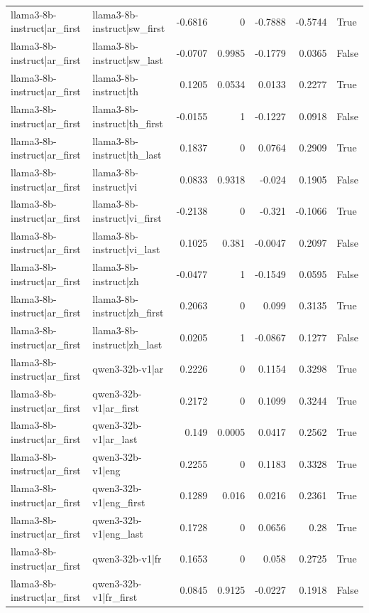 \begin{table}
\begin{tabular}{l l r r r r l}
llama3-8b-instruct|ar_first & llama3-8b-instruct|sw_first & -0.6816 & 0 & -0.7888 & -0.5744 & True \\
llama3-8b-instruct|ar_first & llama3-8b-instruct|sw_last & -0.0707 & 0.9985 & -0.1779 & 0.0365 & False \\
llama3-8b-instruct|ar_first & llama3-8b-instruct|th & 0.1205 & 0.0534 & 0.0133 & 0.2277 & True \\
llama3-8b-instruct|ar_first & llama3-8b-instruct|th_first & -0.0155 & 1 & -0.1227 & 0.0918 & False \\
llama3-8b-instruct|ar_first & llama3-8b-instruct|th_last & 0.1837 & 0 & 0.0764 & 0.2909 & True \\
llama3-8b-instruct|ar_first & llama3-8b-instruct|vi & 0.0833 & 0.9318 & -0.024 & 0.1905 & False \\
llama3-8b-instruct|ar_first & llama3-8b-instruct|vi_first & -0.2138 & 0 & -0.321 & -0.1066 & True \\
llama3-8b-instruct|ar_first & llama3-8b-instruct|vi_last & 0.1025 & 0.381 & -0.0047 & 0.2097 & False \\
llama3-8b-instruct|ar_first & llama3-8b-instruct|zh & -0.0477 & 1 & -0.1549 & 0.0595 & False \\
llama3-8b-instruct|ar_first & llama3-8b-instruct|zh_first & 0.2063 & 0 & 0.099 & 0.3135 & True \\
llama3-8b-instruct|ar_first & llama3-8b-instruct|zh_last & 0.0205 & 1 & -0.0867 & 0.1277 & False \\
llama3-8b-instruct|ar_first & qwen3-32b-v1|ar & 0.2226 & 0 & 0.1154 & 0.3298 & True \\
llama3-8b-instruct|ar_first & qwen3-32b-v1|ar_first & 0.2172 & 0 & 0.1099 & 0.3244 & True \\
llama3-8b-instruct|ar_first & qwen3-32b-v1|ar_last & 0.149 & 0.0005 & 0.0417 & 0.2562 & True \\
llama3-8b-instruct|ar_first & qwen3-32b-v1|eng & 0.2255 & 0 & 0.1183 & 0.3328 & True \\
llama3-8b-instruct|ar_first & qwen3-32b-v1|eng_first & 0.1289 & 0.016 & 0.0216 & 0.2361 & True \\
llama3-8b-instruct|ar_first & qwen3-32b-v1|eng_last & 0.1728 & 0 & 0.0656 & 0.28 & True \\
llama3-8b-instruct|ar_first & qwen3-32b-v1|fr & 0.1653 & 0 & 0.058 & 0.2725 & True \\
llama3-8b-instruct|ar_first & qwen3-32b-v1|fr_first & 0.0845 & 0.9125 & -0.0227 & 0.1918 & False \\

\end{tabular}
\end{table}
